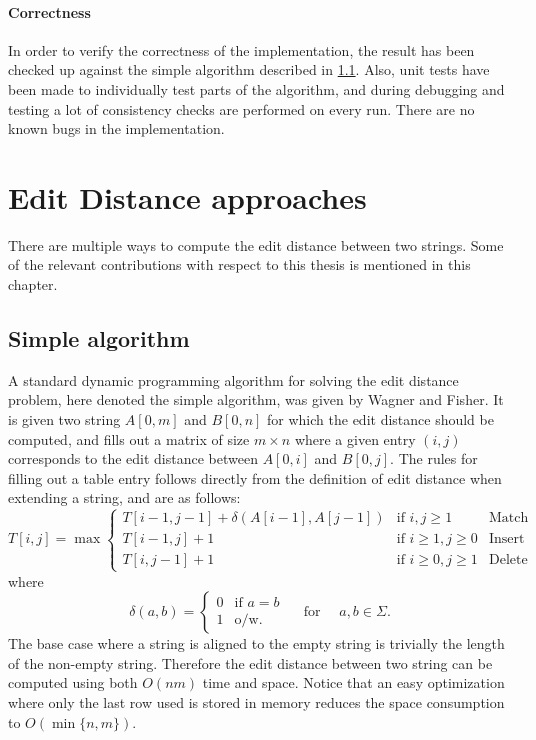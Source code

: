 \documentclass[twoside,11pt,openright]{report}
\newcommand{\str}[3]{#1[#2, #3]}
\begin{document}
\subsubsection{Correctness}
In order to verify the correctness of the implementation, the result has been checked up against the simple algorithm described in \cref{sec:intro:simple}. Also, unit tests have been made to individually test parts of the algorithm, and during debugging and testing a lot of consistency checks are performed on every run. There are no known bugs in the implementation.

\chapter{Edit Distance approaches}
There are multiple ways to compute the edit distance between two strings. Some of the relevant contributions with respect to this thesis is mentioned in this chapter.

\section{Simple algorithm}
\label{sec:intro:simple}
A standard dynamic programming algorithm for solving the edit distance problem, here denoted the simple algorithm, was given by Wagner and Fisher. It is given two string $\str{A}{0}{m}$ and $\str{B}{0}{n}$ for which the edit distance should be computed, and fills out a matrix of size $m \times n$ where a given entry $(i, j)$ corresponds to the edit distance between $\str{A}{0}{i}$ and $\str{B}{0}{j}$. The rules for filling out a table entry follows directly from the definition of edit distance when extending a string, and are as follows:
\[
  T[i, j] = \max \left\{ \begin{array}{lll}
              T[i - 1, j - 1] + \delta(A[i - 1], A[j - 1]) & \text{if } i, j \geq 1 & \text{Match} \\
              T[i - 1, j] + 1       & \text{if } i \geq 1, j \geq 0       & \text{Insert} \\
              T[i, j - 1] + 1       & \text{if } i \geq 0, j \geq 1       & \text{Delete}
            \end{array} \right.
\]
where
\[
  \delta(a, b) = \begin{cases}
                   0 & \text{if } a = b \\
                   1 & \text{o/w.}
                 \end{cases}
    \quad \text{ for } \quad a, b \in \Sigma.
\]
The base case where a string is aligned to the empty string is trivially the length of the non-empty string. Therefore the edit distance between two string can be computed using both $O(nm)$ time and space. Notice that an easy optimization where only the last row used is stored in memory reduces the space consumption to $O(\min\{n, m\})$.
\end{document}

